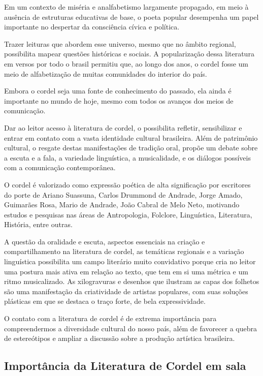 \documentclass[12pt]{extarticle}
\begin{document}
Em um contexto de miséria e analfabetismo largamente propagado, em meio
à ausência de estruturas educativas de base, o poeta popular desempenha
um papel importante no despertar da consciência cívica e política.

Trazer leituras que abordem esse universo, mesmo que no âmbito regional,
possibilita mapear questões históricas e sociais. A popularização dessa
literatura em versos por todo o brasil permitiu que, ao longo dos anos,
o cordel fosse um meio de alfabetização de muitas comunidades do
interior do país.

Embora o cordel seja uma fonte de conhecimento do passado, ela ainda é
importante no mundo de hoje, mesmo com todos os avanços dos meios de
comunicação.

Dar ao leitor acesso à literatura de cordel, o possibilita refletir,
sensibilizar e entrar em contato com a vasta identidade cultural
brasileira. Além de patrimônio cultural, o resgate destas manifestações
de tradição oral, propõe um debate sobre a escuta e a fala, a variedade
linguística, a musicalidade, e os diálogos possíveis com a comunicação
contemporânea.

O cordel é valorizado como expressão poética de alta significação por
escritores do porte de Ariano Suassuna, Carlos Drummond de Andrade,
Jorge Amado, Guimarães Rosa, Mario de Andrade, João Cabral de Melo Neto,
motivando estudos e pesquisas nas áreas de Antropologia, Folclore,
Linguística, Literatura, História, entre outras.

A questão da oralidade e escuta, aspectos essenciais na criação e
compartilhamento na literatura de cordel, as temáticas regionais e a
variação linguística possibilita um campo literário muito convidativo
porque cria no leitor uma postura mais ativa em relação ao texto, que
tem em si uma métrica e um ritmo musicalizado. As xilogravuras e
desenhos que ilustram as capas dos folhetos são uma manifestação da
criatividade de artistas populares, com suas soluções plásticas em que
se destaca o traço forte, de bela expressividade.

O contato com a literatura de cordel é de extrema importância para
compreendermos a diversidade cultural do nosso país, além de favorecer a
quebra de estereótipos e ampliar a discussão sobre a produção artística
brasileira.


\subsection{Importância da Literatura de Cordel em sala}
\end{document}
